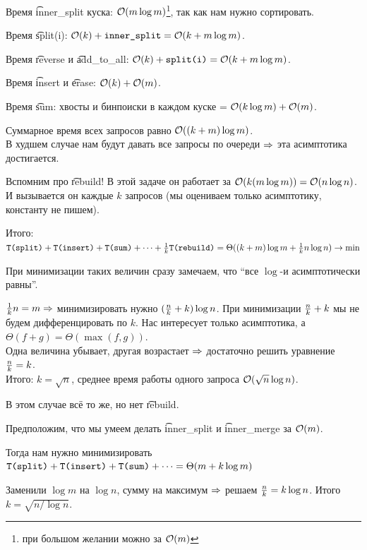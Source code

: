 
Время \t{inner\_split} куска: $\mathcal{O}(m \log m)$\footnote{при большом желании можно за $\mathcal{O}(m)$},
так как нам нужно сортировать.

Время \t{split(i)}: $\mathcal{O}(k) + \texttt{inner\_split} = \mathcal{O}(k + m \log m)$.

Время \t{reverse} и \t{add\_to\_all}: $\mathcal{O}(k) + \texttt{split(i)} = \mathcal{O}(k + m \log m)$.

Время \t{insert} и \t{erase}: $\mathcal{O}(k) + \mathcal{O}(m)$.

Время \t{sum}: хвосты и бинпоиски в каждом куске = $\mathcal{O}(k \log m) + \mathcal{O}(m)$.

Суммарное время всех запросов равно $\mathcal{O}((k + m) \log m)$. \\
В худшем случае нам будут давать все запросы по очереди $\Rightarrow$ эта асимптотика достигается.

\down
Вспомним про \t{rebuild}! В этой задаче он работает за $\mathcal{O}(k (m \log m)) = \mathcal{O}(n \log n)$.\\
И вызывается он каждые $k$ запросов (мы оцениваем только асимптотику, константу не пишем).

\down
Итого: $\texttt{T(split)} + \texttt{T(insert)} + \texttt{T(sum)} + \dots + {\textstyle\frac{1}{k}}\texttt{T(rebuild)} = \Theta((k + m)\log m + {\textstyle\frac{1}{k}}n \log n) \to \min$

\down
При минимизации таких величин сразу замечаем, что ``все $\log$-и асимптотически равны''. 

${\textstyle\frac{1}{k}}n = m \Rightarrow $ минимизировать нужно $({\textstyle\frac{n}{k}}+k)\log n$.
При минимизации ${\textstyle\frac{n}{k}} + k$ мы не будем дифференцировать по $k$. 
Нас интересует только асимптотика, а $\Theta(f + g) = \Theta(\max(f, g))$.\\
Одна величина убывает, другая возрастает $\Rightarrow$ достаточно решить уравнение ${\textstyle\frac{n}{k}} = k$.\\
Итого: $k = \sqrt{n}$, среднее время работы одного запроса $\mathcal{O}(\sqrt{n} \log n)$.


В этом случае всё то же, но нет \t{rebuild}.

Предположим, что мы умеем делать \t{inner\_split} и \t{inner\_merge} за $\mathcal{O}(m)$.

Тогда нам нужно минимизировать $\texttt{T(split)} + \texttt{T(insert)} + \texttt{T(sum)} + \dots = \Theta(m + k \log m)$

Заменили $\log m$ на $\log n$, сумму на максимум $\Rightarrow$ решаем ${\textstyle\frac{n}{k}} = k \log n$. Итого $k = \sqrt{n / \log n}$.


